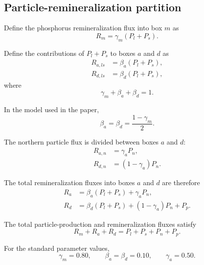 \documentclass[11pt]{article}
\begin{document}
\subsection{Particle-remineralization partition}

Define the phosphorus remineralization flux into box \(m\) as
\begin{equation}
R_m
=
\gamma_m\left(P_l+P_s\right).
\label{eq:seven_Rm}
\end{equation}

Define the contributions of \(P_l+P_s\) to boxes \(a\) and
\(d\) as
\begin{align}
R_{a,ls}
&=
\beta_a\left(P_l+P_s\right),
\label{eq:seven_Ra_ls}
\\
R_{d,ls}
&=
\beta_d\left(P_l+P_s\right),
\label{eq:seven_Rd_ls}
\end{align}
where
\begin{equation}
\gamma_m+\beta_a+\beta_d=1.
\label{eq:seven_partition_sum}
\end{equation}

In the model used in the paper,
\begin{equation}
\beta_a=\beta_d=\frac{1-\gamma_m}{2}.
\label{eq:seven_beta_equal}
\end{equation}

The northern particle flux is divided between boxes \(a\)
and \(d\):
\begin{align}
R_{a,n}
&=
\gamma_aP_n,
\label{eq:seven_Ra_n}
\\
R_{d,n}
&=
\left(1-\gamma_a\right)P_n.
\label{eq:seven_Rd_n}
\end{align}

The total remineralization fluxes into boxes \(a\) and \(d\)
are therefore
\begin{align}
R_a
&=
\beta_a\left(P_l+P_s\right)
+
\gamma_aP_n,
\label{eq:seven_Ra}
\\
R_d
&=
\beta_d\left(P_l+P_s\right)
+
\left(1-\gamma_a\right)P_n
+
P_p.
\label{eq:seven_Rd}
\end{align}

The total particle-production and remineralization fluxes
satisfy
\begin{equation}
R_m+R_a+R_d
=
P_l+P_s+P_n+P_p.
\label{eq:seven_particle_conservation}
\end{equation}

For the standard parameter values,
\begin{equation}
\gamma_m=0.80,
\qquad
\beta_a=\beta_d=0.10,
\qquad
\gamma_a=0.50.
\label{eq:seven_standard_gamma}
\end{equation}
\end{document}
